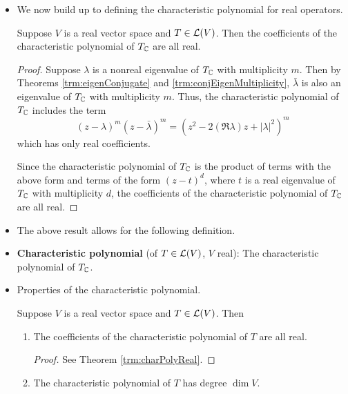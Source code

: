\documentclass[../main.tex]{subfiles}
\begin{document}
\begin{itemize}
\begin{theorem}
\begin{proof}
        \end{proof}
    \end{theorem}
    \item We now build up to defining the characteristic polynomial for real operators.
    \begin{theorem}\label{trm:charPolyReal}
        Suppose $V$ is a real vector space and $T\in\mathcal{L}(V)$. Then the coefficients of the characteristic polynomial of $T_{\mathbb{C}}$ are all real.
        \begin{proof}
            Suppose $\lambda$ is a nonreal eigenvalue of $T_{\mathbb{C}}$ with multiplicity $m$. Then by Theorems \ref{trm:eigenConjugate} and \ref{trm:conjEigenMultiplicity}, $\bar{\lambda}$ is also an eigenvalue of $T_{\mathbb{C}}$ with multiplicity $m$. Thus, the characteristic polynomial of $T_{\mathbb{C}}$ includes the term
            \begin{equation*}
                (z-\lambda)^m(z-\bar{\lambda})^m = (z^2-2(\Re\lambda)z+|\lambda|^2)^m
            \end{equation*}
            which has only real coefficients.\par
            Since the characteristic polynomial of $T_{\mathbb{C}}$ is the product of terms with the above form and terms of the form $(z-t)^d$, where $t$ is a real eigenvalue of $T_{\mathbb{C}}$ with multiplicity $d$, the coefficients of the characteristic polynomial of $T_{\mathbb{C}}$ are all real.
        \end{proof}
    \end{theorem}
    \item The above result allows for the following definition.
    \item \textbf{Characteristic polynomial} (of $T\in\mathcal{L}(V)$, $V$ real): The characteristic polynomial of $T_{\mathbb{C}}$.
    \item Properties of the characteristic polynomial.
    \begin{theorem}\label{trm:charPolRealProperties}
        Suppose $V$ is a real vector space and $T\in\mathcal{L}(V)$. Then
        \begin{enumerate}[label={\textup{(}\alph*\textup{)}},ref={\thetheorem\alph*}]
            \item \label{trm:charPolRealPropertiesa}The coefficients of the characteristic polynomial of $T$ are all real.
            \begin{proof}
                See Theorem \ref{trm:charPolyReal}.
            \end{proof}
            \item \label{trm:charPolRealPropertiesb}The characteristic polynomial of $T$ has degree $\dim V$.

\end{enumerate}
\end{theorem}
\end{itemize}
\end{document}
